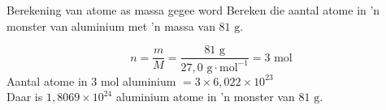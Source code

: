     \noindent
\label{m38717*secfhsst!!!underscore!!!id494}
      \noindent
      \begin{wex}{Berekening van atome as massa gegee word}{
Bereken die aantal atome in 'n monster van aluminium met 'n massa van $81 \text{ g}$.
      }
{
      \label{m38717*id277959}\nopagebreak\noindent{}
        
    \begin{equation*}
    n=\frac{m}{M}=\frac{81 \text{ g}}{27,0 \text{ g} \cdot \text{mol}^{-1}} = 3 \text{ mol}
      \end{equation*}
      \label{m38717*id278019}Aantal atome in 3 mol aluminium $=3 \times 6,022 \times 10^{23}$ \\
      \label{m38717*id278053}Daar is $1,8069 \times 10^{24}$ aluminium atome in 'n monster van $81 \text{ g}$.
}
    \end{wex}
    \noindent
\label{m38717*secfhsst!!!underscore!!!id539}
